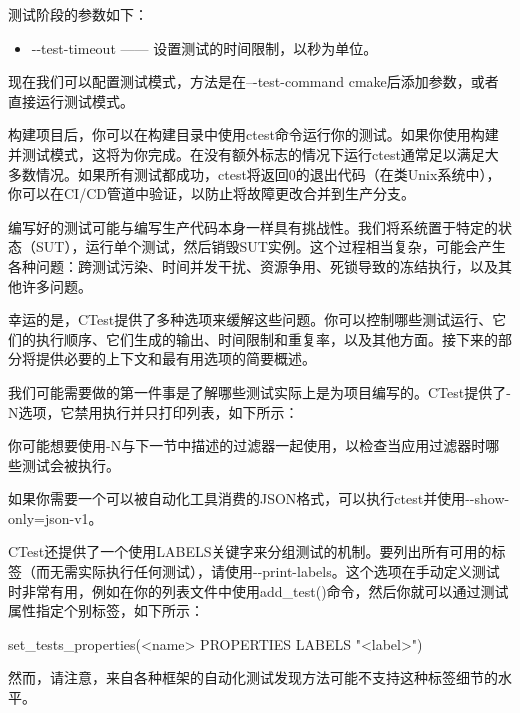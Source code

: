 测试阶段的参数如下：

\begin{itemize}
\item
-{}-test-timeout —— 设置测试的时间限制，以秒为单位。
\end{itemize}

现在我们可以配置测试模式，方法是在–{}-test-command cmake后添加参数，或者直接运行测试模式。


构建项目后，你可以在构建目录中使用ctest命令运行你的测试。如果你使用构建并测试模式，这将为你完成。在没有额外标志的情况下运行ctest通常足以满足大多数情况。如果所有测试都成功，ctest将返回0的退出代码（在类Unix系统中），你可以在CI/CD管道中验证，以防止将故障更改合并到生产分支。

编写好的测试可能与编写生产代码本身一样具有挑战性。我们将系统置于特定的状态（SUT），运行单个测试，然后销毁SUT实例。这个过程相当复杂，可能会产生各种问题：跨测试污染、时间并发干扰、资源争用、死锁导致的冻结执行，以及其他许多问题。

幸运的是，CTest提供了多种选项来缓解这些问题。你可以控制哪些测试运行、它们的执行顺序、它们生成的输出、时间限制和重复率，以及其他方面。接下来的部分将提供必要的上下文和最有用选项的简要概述。


我们可能需要做的第一件事是了解哪些测试实际上是为项目编写的。CTest提供了-N选项，它禁用执行并只打印列表，如下所示：


你可能想要使用-N与下一节中描述的过滤器一起使用，以检查当应用过滤器时哪些测试会被执行。

如果你需要一个可以被自动化工具消费的JSON格式，可以执行ctest并使用-{}-show-only=json-v1。

CTest还提供了一个使用LABELS关键字来分组测试的机制。要列出所有可用的标签（而无需实际执行任何测试），请使用-{}-print-labels。这个选项在手动定义测试时非常有用，例如在你的列表文件中使用add\_test()命令，然后你就可以通过测试属性指定个别标签，如下所示：

\begin{cmake}
set_tests_properties(<name> PROPERTIES LABELS "<label>")
\end{cmake}

然而，请注意，来自各种框架的自动化测试发现方法可能不支持这种标签细节的水平。

